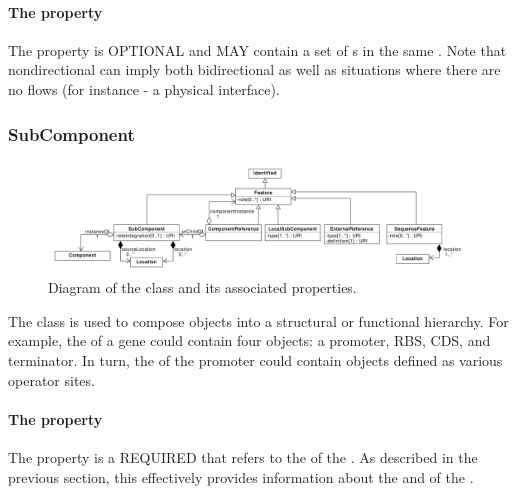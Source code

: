 \paragraph{The  property}
\label{sec:nondirectional:Interface}
The  property is OPTIONAL and MAY contain a set of  s in the same . Note that nondirectional can imply both bidirectional as well as situations where there are no flows (for instance - a physical interface).


\subsubsection{SubComponent}
\label{sec:SubComponent}

\begin{figure}[ht]
\begin{center}
\includegraphics[width=\textwidth]{uml/subcomponent}
\caption[]{Diagram of the  class and its associated properties.}
\label{uml:subcomponent}
\end{center}
\end{figure}

The  class is used to compose  objects into a structural or functional hierarchy. For example, the  of a gene could contain four  objects: a promoter, RBS, CDS, and terminator. In turn, the  of the promoter  could contain  objects defined as various operator sites.

\paragraph{The  property}
\label{sec:instanceOf}

The  property is a REQUIRED  that refers to the  of the .
As described in the previous section, this  effectively provides information about the  and  of the .

